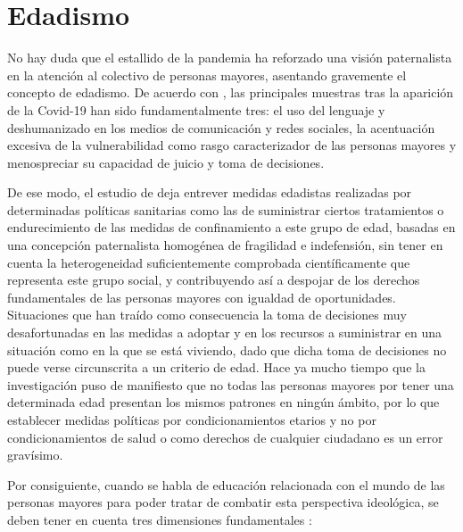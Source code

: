 \documentclass{textolivre}
\begin{document}
\section{Edadismo}
No hay duda que el estallido de la pandemia ha reforzado una visión paternalista en la atención al colectivo de personas mayores, asentando gravemente el concepto de edadismo. De acuerdo con \textcite{helpage2020b}, %
las principales muestras tras la aparición de la Covid-19 han sido fundamentalmente tres: el uso del lenguaje y deshumanizado en los medios de comunicación y redes sociales, la acentuación excesiva de la vulnerabilidad como rasgo caracterizador de las personas mayores y menospreciar su capacidad de juicio y toma de decisiones.

De ese modo, el estudio de \textcite{bravovillar2020} %
deja entrever medidas edadistas realizadas por determinadas políticas sanitarias como las de suministrar ciertos tratamientos o endurecimiento de las medidas de confinamiento a este grupo de edad, basadas en una concepción paternalista homogénea de fragilidad e indefensión, sin tener en cuenta la heterogeneidad suficientemente comprobada científicamente que representa este grupo social, y contribuyendo así a despojar de los derechos fundamentales de las personas mayores con igualdad de oportunidades. Situaciones que han traído como consecuencia la toma de decisiones muy desafortunadas en las medidas a adoptar y en los recursos a suministrar en una situación como en la que se está viviendo, dado que dicha toma de decisiones no puede verse circunscrita a un criterio de edad. Hace ya mucho tiempo que la investigación puso de manifiesto que no todas las personas mayores por tener una determinada edad presentan los mismos patrones en ningún ámbito, por lo que establecer medidas políticas por condicionamientos etarios y no por condicionamientos de salud o como derechos de cualquier ciudadano es un error gravísimo.

Por consiguiente, cuando se habla de educación relacionada con el mundo de las personas mayores para poder tratar de combatir esta perspectiva ideológica, se deben tener en cuenta tres dimensiones fundamentales \textcite{martinezdemiguel2016}: %
\end{document}

